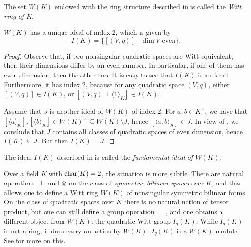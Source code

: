 \documentclass[12pt, leqno, british]{amsart}
\begin{document}
\begin{defi}
The set $W(K)$ endowed with the ring structure described in  is called the \emph{Witt ring of $K$}.
\end{defi}
\begin{prop}\label{P:fundamental-ideal}
$W(K)$ has a unique ideal of index $2$, which is given by
$$ I(K) = \lbrace [(V, q)] \mid \dim V \text{ even} \rbrace.$$
\end{prop}
\begin{proof}
Observe that, if two nonsingular quadratic spaces are Witt equivalent, then their dimensions differ by an even number.
In particular, if one of them has even dimension, then the other too.
It is easy to see that $I(K)$ is an ideal.
Furthermore, it has index 2, because for any quadratic space $(V, q)$, either $[(V, q)] \in I(K)$, or $[(V, q) \perp \langle 1 \rangle_K] \in I(K)$.

Assume that $J$ is another ideal of $W(K)$ of index $2$.
For $a, b \in K^\times$, we have that $[\langle a \rangle_K], [\langle b \rangle_K] \in W(K)^\times \subseteq W(K) \setminus J$, hence $[\langle a, b \rangle_K] \in J$.
In view of , we conclude that $J$ contains all classes of quadratic spaces of even dimension, hence $I(K) \subseteq J$.
But then $I(K) = J$.
\end{proof}
\begin{defi}
The ideal $I(K)$ described in  is called the \emph{fundamental ideal of $W(K)$}.
\end{defi}

\begin{rem}
Over a field $K$ with $\operatorname{char}(K) = 2$, the situation is more subtle. There are natural operations $\perp$ and $\otimes$ on the class of \textit{symmetric bilinear spaces} over $K$, and this allows one to define a Witt ring $W(K)$ of nonsingular symmetric bilinear forms.
On the class of quadratic spaces over $K$ there is no natural notion of tensor product, but one can still define a group operation $\perp$, and one obtains a different object from $W(K)$: the quadratic Witt group $I_q(K)$.
While $I_q(K)$ is not a ring, it does carry an action by $W(K)$: $I_q(K)$ is a $W(K)$-module.
See \autocite[Sections 2, 8]{ElmanKarpenkoMerkurjev} for more on this.
\end{rem}
\end{document}

